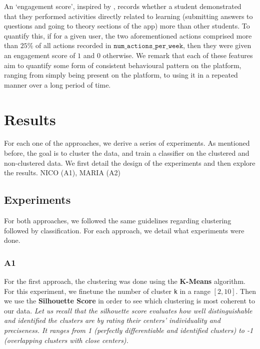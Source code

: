 \documentclass[sigplan,screen]{acmart}
\begin{document}
An `engagement score', inspired by \cite{student_engagement}, records whether a student demonstrated that they performed activities directly related to learning (submitting answers to questions and going to theory sections of the app) more than other students. To quantify this, if for a given user, the two aforementioned actions comprised more than $25\%$ of all actions recorded in $\texttt{num\_actions\_per\_week}$, then they were given an engagement score of $1$ and $0$ otherwise. We remark that each of these features aim to quantify some form of consistent behavioural pattern on the platform, ranging from simply being present on the platform, to using it in a repeated manner over a long period of time. 

\section{Results}\label{sec:results}

For each one of the approaches, we derive a series of experiments. As mentioned before, the goal is to cluster the data, and train a classifier on the clustered and non-clustered data. We first detail the design of the experiments and then explore the results.
{\color{red}NICO (A1), MARIA (A2)}
\subsection{Experiments}\label{subsec:eval}

For both approaches, we followed the same guidelines regarding clustering followed by classification. For each approach, we detail what experiments were done.\\

\subsubsection{A1}
For the first approach, the clustering was done using the \textbf{K-Means} algorithm. For this experiment, we finetune the number of cluster \texttt{k} in a range $[2, 10]$. Then we use the \textbf{Silhouette Score} in order to see which clustering is most coherent to our data. \textit{Let us recall that the silhouette score evaluates how well distinguishable and identified the clusters are by rating their centers’ individuality and preciseness. It ranges from 1 (perfectly differentiable and identified clusters) to -1 (overlapping clusters with close centers).}
\end{document}
